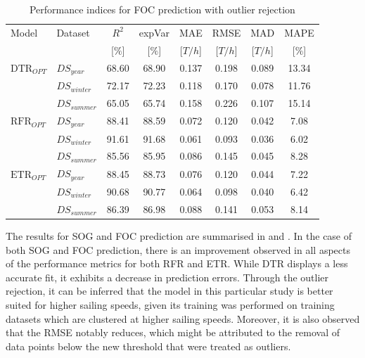 \begin{table}[h!]
    \small
    \centering
    {\begin{tabular}{ l l c c c c c c }
    \hline
    Model & Dataset & $R^2$ & expVar & MAE & RMSE & MAD & MAPE \\
    & & [$\%$] & [$\%$] & [$T/h$] & [$T/h$] & [$T/h$] & [$\%$]  \\ 
    \hline
    $\text{DTR}_{OPT}$ & $DS_{year}$ & 68.60 & 68.90 & 0.137 & 0.198  & 0.089 & 13.34  \\
    & $DS_{winter}$ & 72.17 & 72.23 & 0.118 & 0.170 & 0.078 & 11.76 \\
    & $DS_{summer}$ & 65.05 & 65.74 & 0.158 &  0.226 & 0.107 & 15.14 \\
    $\text{RFR}_{OPT}$ & $DS_{year}$  & 88.41 & 88.59  & 0.072 & 0.120 & 0.042 & 7.08 \\
    & $DS_{winter}$ & 91.61 & 91.68 & 0.061 & 0.093  & 0.036  & 6.02 \\
    & $DS_{summer}$ & 85.56 & 85.95 & 0.086 & 0.145 & 0.045 & 8.28 \\
    $\text{ETR}_{OPT}$ & $DS_{year}$ & 88.45 & 88.73 & 0.076  & 0.120 & 0.044 & 7.22\\
    & $DS_{winter}$ & 90.68 & 90.77 & 0.064 & 0.098 & 0.040 & 6.42 \\
    & $DS_{summer}$ & 86.39 & 86.98 & 0.088 & 0.141 & 0.053 & 8.14 \\
    \hline
    \end{tabular}}
\caption{Performance indices for FOC prediction with outlier rejection}\label{tbl:FOC_scores_errors_rejection}
\end{table}

The results for SOG and FOC prediction are summarised in  and . In the case of both SOG and FOC prediction, there is an improvement observed in all aspects of the performance metrics for both RFR and ETR. While DTR displays a less accurate fit, it exhibits a decrease in prediction errors. Through the outlier rejection, it can be inferred that the model in this particular study is better suited for higher sailing speeds, given its training was performed on training datasets which are clustered at higher sailing speeds. Moreover, it is also observed that the RMSE notably reduces, which might be attributed to the removal of data points below the new threshold that were treated as outliers. \\

